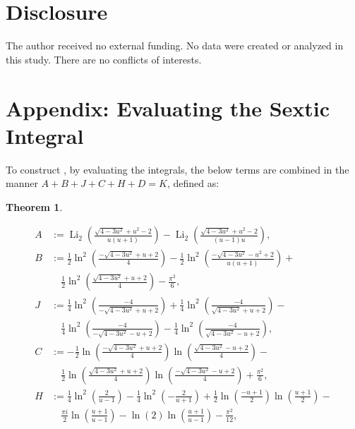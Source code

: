 \documentclass[12pt]{article}
\newtheorem{theorem}{Theorem}
\begin{document}
{\section{Disclosure}
 The author received   no external funding. No data were created or analyzed in this study. There are no conflicts of interests.


\section{Appendix: Evaluating the Sextic Integral}\label{sec:appendix}
To construct  , by evaluating the integrals, the below terms are combined in the manner $A + B + J + C + H + D =   K$, defined as: 
\begin{theorem}\label{maintheorem}
  
\begin{align*}
 A & := \operatorname{Li}_2\left(\frac{\sqrt{4 - 3u^2} + u^2 - 2}{u (u + 1)}\right) 
 - \operatorname{Li}_2\left(\frac{\sqrt{4 - 3u^2} + u^2 - 2}{(u - 1) u}\right), \\ 
 B & := 
 \frac{1}{2} \ln^2\left(\frac{- \sqrt{4-3 u^2}+u+2}{4} \right) - 
 \frac{1}{2} \ln ^2\left(\frac{-  \sqrt{4-3 u^2 } - u^2 +2}{u 
 (u+1)}\right) + \\ 
 & \quad \frac{1}{2} \ln ^2\left(\frac{ \sqrt{4-3 u^2 } + u + 2}{4} \right)-\frac{\pi ^2}{6}, \\ 
 J & := \frac{1}{4} \ln^2 \left( \frac{-4}{- \sqrt{4-3 u^2 } + u + 2} \right) + 
 \frac{1}{4} \ln^2 \left( \frac{-4}{ \sqrt{4-3 u^2 } + u + 2} \right) - \\ 
 &\quad \frac{1}{4} \ln^2 \left( \frac{-4}{- \sqrt{4-3 u^2 } - u + 2} \right) - \frac{1}{4} 
 \ln^2 \left( \frac{-4}{ \sqrt{4-3 u^2 } - u + 2} \right), \\ 
 C & := - \frac{1}{2} \ln \left( \frac{ -  \sqrt{4-3 u^2} + u + 
 2}{4} \right) \ln \left( \frac{  \sqrt{4-3 u^2 } - u + 2}{4} \right) - \\ 
 & \quad \frac{1}{2} \ln \left( \frac{ \sqrt{4-3 u^2 } + u + 2}{4} \right) 
 \ln \left( \frac{-  \sqrt{4-3 u^2} - u + 2}{4} \right) + \frac{\pi^2}{6}, \\ 
 H & := 
 \frac{1}{4} \ln^2\left(\frac{2}{u-1}\right)-\frac{1}{4} \ln ^2\left(-\frac{2}{u+1}\right)+\frac{1}{2} \ln \left(\frac{-u + 1}{2} \right) 
 \ln \left(\frac{u+1}{2}\right) - \\ 
 & \quad \frac{\pi i}{2} \ln \left(\frac{u + 
 1}{u-1}\right)-\ln (2) \ln \left(\frac{u+1}{u-1}\right)-\frac{\pi^2}{12}, \\ 

\end{align*}
\end{theorem}}
\end{document}
